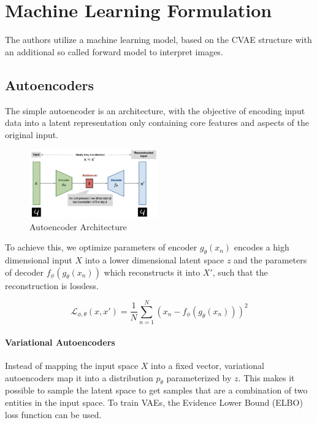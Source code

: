 \documentclass[a4paper,10pt,twocolumn]{article}
\begin{document}
    \section{Machine Learning Formulation}

        The authors utilize a machine learning model, based on the CVAE structure with 
        an additional so called forward model to interpret images\cite{minartz_cpm}. 

        \subsection{Autoencoders}
            The simple autoencoder is an architecture, with the 
            objective of encoding input data into a latent representation only 
            containing core features and aspects of the original input\cite{weng_autocoders}.
            
            \begin{figure}[H]
                \centering
                \includegraphics[width=0.49\textwidth]{../images/autoencoder-architecture.png}
                \caption{Autoencoder Architecture}\label{fig:autoencoder}
            \end{figure}

            To achieve this, we optimize parameters of encoder $g_{\theta} ({x_n})$ 
            encodes a high dimensional input $X$ into a lower dimensional latent space $z$ 
            and the parameters of decoder $f_{\phi} (g_{\theta} ({x_n}))$ which reconstructs it into $X'$,
            such that the reconstruction is lossless.

            \begin{equation}
                \mathcal{L}_{\phi, \theta}({x}, {x'}) = \frac{1}{N} \sum_{n=1}^{N} {({x_n} - f_{\phi} (g_{\theta} ({x_n})))}^2
                \label{eq:lossfunc}
            \end{equation}
            
            \paragraph{Variational Autoencoders}
            Instead of mapping the input space $X$ into a fixed vector, variational autoencoders
            map it into a distribution $p_\theta$ parameterized by $z$\cite{rocca_vaes}.
            This makes it possible to sample the latent space to get samples that are a combination
            of two entities in the input space.
            To train VAEs, the Evidence Lower Bound (ELBO) loss function can be used.
\end{document}

